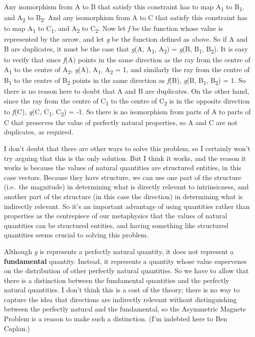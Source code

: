 \documentclass[
  11pt,
  letterpaper,
  DIV=11,
  numbers=noendperiod,
  twoside]{scrartcl}
\begin{document}
Any isomorphism from A to B that satisfy this constraint has to map
A\textsubscript{1} to B\textsubscript{1}, and A\textsubscript{2} to
B\textsubscript{2}. And any isomorphism from A to C that satisfy this
constraint has to map A\textsubscript{1} to C\textsubscript{1}, and
A\textsubscript{2} to C\textsubscript{2}. Now let \emph{f} be the
function whose value is represented by the arrow, and let \emph{g} be
the function defined as above. So if A and B are duplicates, it must be
the case that \emph{g}(A, A\textsubscript{1}, A\textsubscript{2}) =
\emph{g}(B, B\textsubscript{1}, B\textsubscript{2}). It is easy to
verify that since \emph{f}(A) points in the same direction as the ray
from the centre of A\textsubscript{1} to the centre of
A\textsubscript{2}, \emph{g}(A), A\textsubscript{1}, A\textsubscript{2}
= 1, and similarly the ray from the centre of B\textsubscript{1} to the
centre of B\textsubscript{2} points in the same direction as
\emph{f}(B), \emph{g}(B, B\textsubscript{1}, B\textsubscript{2}) = 1. So
there is no reason here to doubt that A and B are duplicates. On the
other hand, since the ray from the centre of C\textsubscript{1} to the
centre of C\textsubscript{2} is in the opposite direction to
\emph{f}(C), \emph{g}(C, C\textsubscript{1}, C\textsubscript{2}) = -1.
So there is no isomorphism from parts of A to parts of C that preserves
the value of perfectly natural properties, so A and C are not
duplicates, as required.

I don't doubt that there are other ways to solve this problem, so I
certainly won't try arguing that this is the only solution. But I think
it works, and the reason it works is because the values of natural
quantities are structured entities, in this case vectors. Because they
have structure, we can use one part of the structure (i.e.~the
magnitude) in determining what is directly relevant to intrinsicness,
and another part of the structure (in this case the direction) in
determining what is indirectly relevant. So it's an important advantage
of using quantities rather than properties as the centrepiece of our
metaphysics that the values of natural quantities can be structured
entities, and having something like structured quantities seems crucial
to solving this problem.

Although \emph{g} is represents a perfectly natural quantity, it does
not represent a \textbf{fundamental} quantity. Instead, it represents a
quantity whose value supervenes on the distribution of other perfectly
natural quantities. So we have to allow that there is a distinction
between the fundamental quantities and the perfectly natural quantities.
I don't think this is a cost of the theory; there is no way to capture
the idea that directions are indirectly relevant without distinguishing
between the perfectly natural and the fundamental, so the Asymmetric
Magnets Problem is a reason to make such a distinction. (I'm indebted
here to Ben Caplan.)
\end{document}
